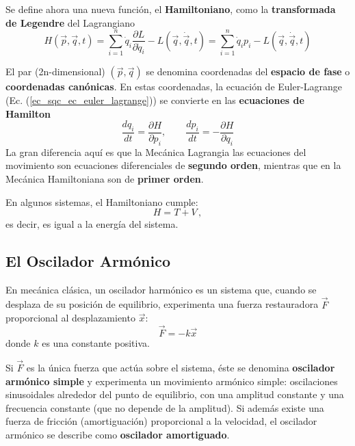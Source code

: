    Se define ahora una nueva función, el \textbf{Hamiltoniano}, como la \textbf{transformada de Legendre} del Lagrangiano
    \begin{equation} \label{ec_sqc_FHamiltoniano_Legendre}
        H(\vec{p}, \vec{q}, t) = \sum_{i=1}^n \dot{q}_i \frac{\partial L}{\partial \dot{q}_i} - L(\vec{q}, \dot{\vec{q}}, t) =
        \sum_{i=1}^n \dot{q}_i p_i - L(\vec{q}, \dot{\vec{q}}, t)
    \end{equation}

    El par (2n-dimensional) $(\vec{p},\vec{q})$ se denomina coordenadas del \textbf{espacio de fase} o \textbf{coordenadas canónicas}. En estas coordenadas, la ecuación de Euler-Lagrange (Ec. (\ref{ec_sqc_ec_euler_lagrange})) se convierte en las \textbf{ecuaciones de Hamilton}
    \begin{equation} \label{ec_sqc_FHamiltoniano_ec_Hamil}
        \frac{d q_i}{dt} = \frac{\partial H}{\partial p_i}, \qquad
        \frac{d p_i}{dt} = - \frac{\partial H}{\partial q_i}
    \end{equation}
    La gran diferencia aquí es que la Mecánica Lagrangia las ecuaciones del movimiento son ecuaciones diferenciales de \textbf{segundo orden}, mientras que en la Mecánica Hamiltoniana son de \textbf{primer orden}.

    En algunos sistemas, el Hamiltoniano cumple:
    \begin{equation} \label{ec_sqc_oscilador_H_T_V}
        H = T + V\, ,
    \end{equation}
    es decir, es igual a la energía del sistema.






    \subsection{El Oscilador Armónico}

    En mecánica clásica, un oscilador harmónico es un sistema que, cuando se desplaza de su posición de equilibrio, experimenta una fuerza restauradora $\vec{F}$ proporcional al desplazamiento $\vec{x}$:
    \begin{equation}
        \vec{F} = -k \vec{x}
    \end{equation}
    donde $k$ es una constante positiva.

    Si $\vec{F}$ es la única fuerza que actúa sobre el sistema, éste se denomina \textbf{oscilador armónico simple} y experimenta un movimiento armónico simple: oscilaciones sinusoidales alrededor del punto de equilibrio, con una amplitud constante y una frecuencia constante (que no depende de la amplitud). Si además existe una fuerza de fricción (amortiguación) proporcional a la velocidad, el oscilador armónico se describe como \textbf{oscilador amortiguado}. 

